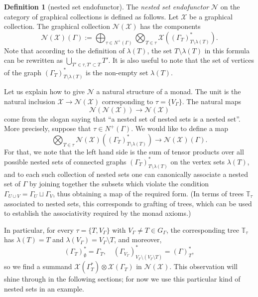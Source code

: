 \documentclass[11pt]{article}
\theoremstyle{definition}
\newtheorem{defi}[theo]{Definition}
\numberwithin{equation}{section}
\newcommand\calN{\mathcal{N}}
\newcommand\calX{\mathcal{X}}
\begin{document}
\begin{defi}[nested set endofunctor]
The \emph{nested set endofunctor} $\calN$ on the category of graphical collections is defined as follows. Let $\calX$ be a graphical collection. The graphical collection $\calN(\calX)$ has the components
 \[
\calN(\calX)(\Gamma):=\bigoplus_{\tau\in N^+(\Gamma)}\bigotimes_{T\in \tau}\calX((\Gamma_T)^*_{T\setminus\lambda(T)}).
 \] 
Note that according to the definition of $\lambda(T)$, the set $T\setminus\lambda(T)$ in this formula can be rewritten as $\bigcup_{T'\in \tau, T'\subset T} T'$. It is also useful to note that the set of vertices of the graph $(\Gamma_T)^*_{T\setminus\lambda(T)}$ is the non-empty set $\lambda(T)$.
\end{defi}

Let us explain how to give $\calN$ a natural structure of a monad. The unit is the natural inclusion $\calX\to\calN(\calX)$ corresponding to $\tau=\{V_\Gamma\}$. The natural maps
 \[
\calN(\calN(\calX))\to\calN(\calX)
 \]
come from the slogan saying that ``a nested set of nested sets is a nested set''. More precisely, suppose that $\tau\in N^+(\Gamma)$. We would like to define a map 
 \[
\bigotimes_{T\in \tau}\calN(\calX)((\Gamma_T)^*_{T\setminus\lambda(T)})\to \calN(\calX)(\Gamma). 
 \]
For that, we note that the left hand side is the sum of tensor products over all possible nested sets of connected graphs $(\Gamma_T)^*_{T\setminus\lambda(T)}$ on the vertex sets $\lambda(T)$, and to each such collection of nested sets one can canonically associate a nested set of $\Gamma$ by joining together the subsets which violate the condition $\Gamma_{U\cup V}=\Gamma_U\sqcup\Gamma_V$, thus obtaining a map of the required form. (In terms of trees $\mathbb{T}_\tau$ associated to nested sets, this corresponds to grafting of trees, which can be used to establish the associativity required by the monad axioms.)

In particular, for every $\tau=\{T,V_\Gamma\}$ with $V_\Gamma\ne T\in G_\Gamma$, the corresponding tree $\mathbb{T}_\tau$ has $\lambda(T)=T$ and $\lambda(V_\Gamma)=V_\Gamma\setminus T$, and moreover,
 \[
(\Gamma_T)^*_{\emptyset}=\Gamma_T, \quad (\Gamma_{V_\Gamma})^*_{V_\Gamma\setminus (V_\Gamma\setminus T)}=(\Gamma)^*_T,
 \]
so we find a summand $\calX(\Gamma^*_T)\otimes\calX(\Gamma_T)$ in $\calN(\calX)$. This observation will shine through in the following sections; for now we use this particular kind of nested sets in an example.
\end{document}
